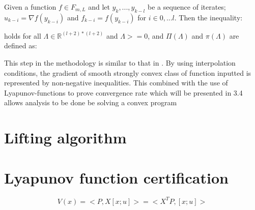 \begin{corollary}
	Given a function \(f \in F_{m,L}\) and let \(y_k,...,y_{k-l}\) be a sequence of iterates; \(u_{k-i} = \nabla f(y_{k-i})\) and \(f_{k-i} = f(y_{k-i})\) for \(i \in 0,...l\). Then the inequality:
	
	holds for all \(\Lambda \in \mathbb{R}^{(l+2) * (l+2)}\) and \(\Lambda >= 0\), and \(\Pi(\Lambda)\) and  \(\pi(\Lambda)\) are defined as:

\end{corollary}

This step in the methodology is similar to that in \cite{pepit}. By using interpolation conditions, the gradient of smooth strongly convex class of function inputted is represented by non-negative inequalities. This combined with the use of Lyapunov-functions to prove convergence rate which will be presented in 3.4 allows analysis to be done be solving a convex program

\section{Lifting algorithm}

\section{Lyapunov function certification}
\begin{equation} \label{eqn:Lyapunov}
	V(x) = <P, X[x; u]> = <X^T P, [x; u]>
\end{equation}

